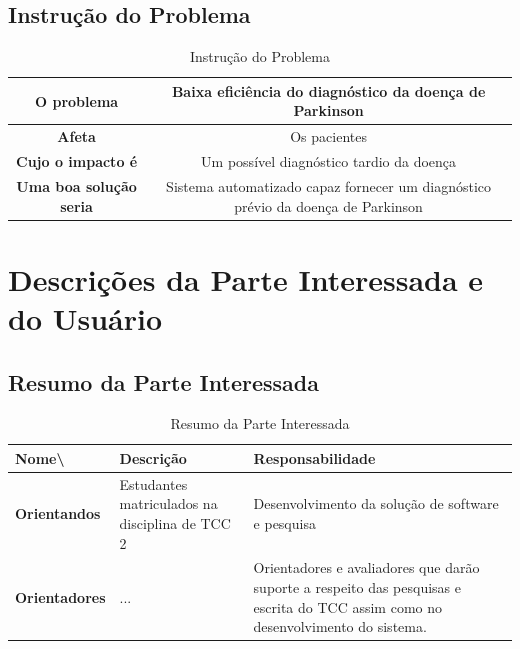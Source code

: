 \begin{anexosenv}
\subsection{Instrução do Problema}

    \begin{table}[]
        \centering
        \caption{Instrução do Problema}
        \begin{tabular}{|c|c|}
        \hline
        \textbf{O problema}            & Baixa eficiência do diagnóstico da doença de Parkinson                           \\ \hline
        \textbf{Afeta}                 & Os pacientes                                                                     \\ \hline
        \textbf{Cujo o impacto é}      & Um possível diagnóstico tardio da doença                                         \\ \hline
        \textbf{Uma boa solução seria} & Sistema automatizado capaz fornecer um diagnóstico prévio da doença de Parkinson \\ \hline
        \end{tabular}
        \label{table:Instrução do Problema}
    \end{table}

\section{Descrições da Parte Interessada e do Usuário}

\subsection{Resumo da Parte Interessada}

    \begin{table}[]
        \centering
        \caption{Resumo da Parte Interessada}
        \begin{tabular}{@{}|l|l|l|@{}}
        \toprule
        \textbf{Nome\textbackslash{}} & \textbf{Descrição}                             & \textbf{Responsabilidade}                                                                                                        \\ \midrule
        \textbf{Orientandos}          & Estudantes matriculados na disciplina de TCC 2 & Desenvolvimento da solução de software e pesquisa                                                                                \\ \midrule
        \textbf{Orientadores}         & ...                                            & Orientadores e avaliadores que darão suporte a respeito das pesquisas e escrita do TCC assim como no desenvolvimento do sistema. \\ \bottomrule
        \end{tabular}
        \label{table:Resumo da Parte Interessada}
    \end{table}


\end{anexosenv}
